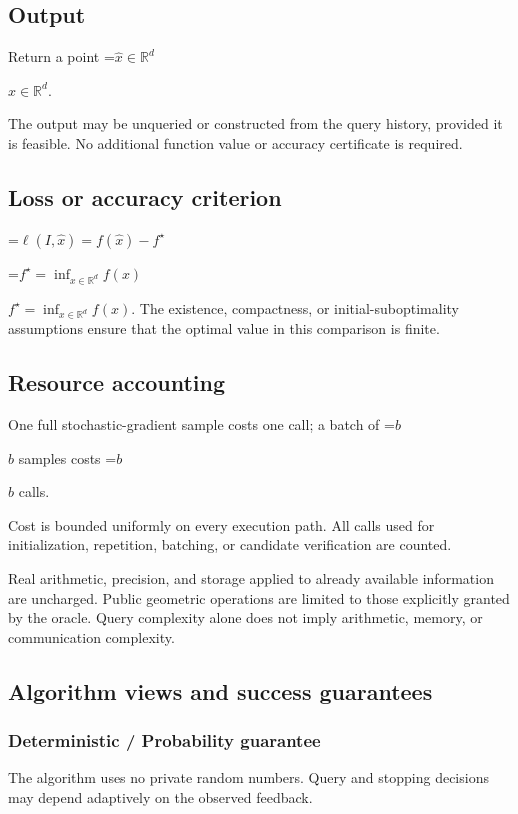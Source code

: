 \documentclass[10pt,a4paper]{article}
\newcommand{\AtlasMath}[1]{\par\begingroup\centering\setbox0=\hbox{$\displaystyle #1$}\ifdim\wd0>1.4\linewidth\typeout{ATLAS WIDE FORMULA: \the\wd0}\fi\ifdim\wd0>\linewidth\resizebox{\linewidth}{!}{\box0}\else\box0\fi\par\endgroup}
\newcommand{\AtlasInlineMath}[1]{\begingroup\setbox0=\hbox{$#1$}\ifdim\wd0>.4\linewidth\endgroup\AtlasMath{#1}\else\endgroup$#1$\fi}
\begin{document}
\subsection{Output}
Return a point \AtlasInlineMath{\widehat x\in\mathbb R^d}.

The output may be unqueried or constructed from the query history, provided it is feasible. No additional function value or accuracy certificate is required.

\subsection{Loss or accuracy criterion}

\AtlasMath{\ell(I,\widehat{x})=f(\widehat{x})-f^\star}


\AtlasInlineMath{f^\star=\inf_{x\in \mathbb{R}^d}f(x)}. The existence, compactness, or initial-suboptimality assumptions ensure that the optimal value in this comparison is finite.

\subsection{Resource accounting}
One full stochastic-gradient sample costs one call; a batch of \AtlasInlineMath{b} samples costs \AtlasInlineMath{b} calls.

Cost is bounded uniformly on every execution path. All calls used for initialization, repetition, batching, or candidate verification are counted.

Real arithmetic, precision, and storage applied to already available information are uncharged. Public geometric operations are limited to those explicitly granted by the oracle. Query complexity alone does not imply arithmetic, memory, or communication complexity.

\subsection{Algorithm views and success guarantees}
\subsubsection{Deterministic / Probability guarantee}
The algorithm uses no private random numbers. Query and stopping decisions may depend adaptively on the observed feedback.
\end{document}
